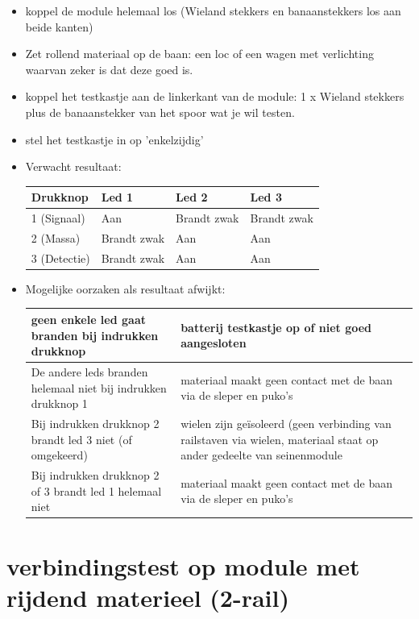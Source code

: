 \documentclass[12pt,a4paper]{report}
\begin{document}
\begin{itemize}
\item koppel de module helemaal los (Wieland stekkers en banaanstekkers los aan beide kanten) 
\item Zet rollend materiaal op de baan: een loc of een wagen met verlichting waarvan zeker is dat deze goed is.
\item koppel het testkastje aan de linkerkant van de module: 1 x Wieland stekkers plus de banaanstekker van het spoor wat je wil testen.

\item stel het testkastje in op 'enkelzijdig' 

\item Verwacht resultaat:

\begin{tabular}{|l|l|l|l|}
\hline
Drukknop&Led 1&Led 2&Led 3\\
\hline
1 (Signaal)&Aan&Brandt zwak&Brandt zwak\\
\hline
2 (Massa)&Brandt zwak&Aan&Aan\\
\hline
3 (Detectie)&Brandt zwak&Aan&Aan\\
\hline
\end{tabular}

\item Mogelijke oorzaken als resultaat afwijkt:

\begin{tabular}{|p{8cm}|p{6cm}|}
\hline
geen enkele led gaat branden bij indrukken drukknop&batterij testkastje op of niet goed aangesloten\\
\hline
De andere leds branden helemaal niet bij indrukken drukknop 1&materiaal maakt geen contact met de baan via de sleper en puko's\\
\hline
Bij indrukken drukknop 2 brandt led 3 niet (of omgekeerd)&wielen zijn ge\"{i}soleerd (geen verbinding van railstaven via wielen, materiaal staat op ander gedeelte van seinenmodule\\
\hline
Bij indrukken drukknop 2 of 3 brandt led 1 helemaal niet&materiaal maakt geen contact met de baan via de sleper en puko's\\
\hline
\end{tabular}

\end{itemize}

\section{verbindingstest op module met rijdend materieel (2-rail)}
\end{document}
